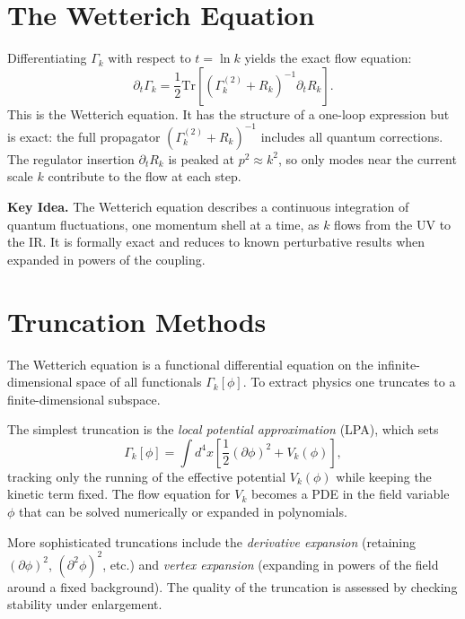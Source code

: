 \documentclass[12pt,a4paper,oneside]{book}
\theoremstyle{definition}
\theoremstyle{plain}
\theoremstyle{remark}
\newenvironment{keyidea}{%
  \begin{mdframed}[linecolor=black!40,backgroundcolor=black!4,
    leftmargin=0pt,rightmargin=0pt,innerleftmargin=10pt,
    innerrightmargin=10pt,innertopmargin=8pt,innerbottommargin=8pt]
  \noindent\textbf{Key Idea.}\space}{%
  \end{mdframed}}
\begin{document}
\section{The Wetterich Equation}

Differentiating $\Gamma_k$ with respect to $t = \ln k$ yields the exact flow
equation:
\begin{equation}
\partial_t\Gamma_k = \frac{1}{2}\mathrm{Tr}\left[(\Gamma_k^{(2)} + R_k)^{-1}\partial_t R_k\right].
\label{eq:wetterich_text}
\end{equation}
This is the Wetterich equation. It has the structure of a one-loop expression
but is exact: the full propagator $(\Gamma_k^{(2)} + R_k)^{-1}$ includes all
quantum corrections. The regulator insertion $\partial_t R_k$ is peaked at
$p^2 \approx k^2$, so only modes near the current scale $k$ contribute to the
flow at each step.

\begin{keyidea}
The Wetterich equation describes a continuous integration of quantum
fluctuations, one momentum shell at a time, as $k$ flows from the UV to
the IR. It is formally exact and reduces to known perturbative results when
expanded in powers of the coupling.
\end{keyidea}

\section{Truncation Methods}

The Wetterich equation is a functional differential equation on the
infinite-dimensional space of all functionals $\Gamma_k[\phi]$. To extract
physics one truncates to a finite-dimensional subspace.

The simplest truncation is the \emph{local potential approximation} (LPA),
which sets
\begin{equation}
\Gamma_k[\phi] = \int d^4x\left[\frac{1}{2}(\partial\phi)^2 + V_k(\phi)\right],
\end{equation}
tracking only the running of the effective potential $V_k(\phi)$ while keeping
the kinetic term fixed. The flow equation for $V_k$ becomes a PDE in the field
variable $\phi$ that can be solved numerically or expanded in polynomials.

More sophisticated truncations include the \emph{derivative expansion} (retaining
$(\partial\phi)^2$, $(\partial^2\phi)^2$, etc.) and \emph{vertex expansion}
(expanding in powers of the field around a fixed background). The quality of
the truncation is assessed by checking stability under enlargement.
\end{document}
